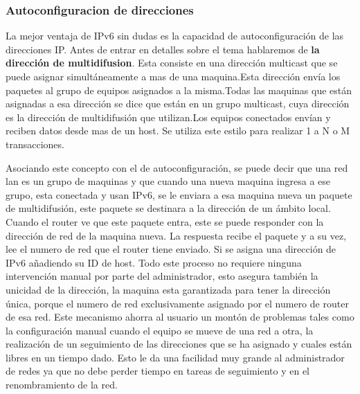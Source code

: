 \documentclass[11pt,a4paper]{article}
\begin{document}
\subsubsection{Autoconfiguracion de direcciones}
La mejor ventaja de IPv6 sin dudas es la capacidad de autoconfiguración de las direcciones IP. Antes 
de entrar en detalles sobre el tema hablaremos de \textbf{la dirección de multidifusion}. Esta 
consiste en una dirección multicast que se puede asignar simultáneamente a mas de una maquina.Esta 
dirección envía los paquetes al grupo de equipos asignados a la misma.Todas las maquinas que están 
asignadas a esa dirección se dice que están en un grupo multicast, cuya dirección es la dirección  
de multidifusión que utilizan.Los equipos conectados envían y reciben datos desde mas de un host. Se 
utiliza este estilo para realizar 1 a N o M transacciones.\par
Asociando este concepto con el de autoconfiguración, se puede decir que una red lan es un grupo de 
maquinas y que cuando una nueva maquina ingresa a ese grupo, esta conectada y usan IPv6, se le 
enviara a esa maquina nueva un paquete de multidifusión, este paquete se destinara a la dirección 
de un ámbito local. Cuando el router ve que este paquete entra, este se puede responder con la 
dirección de red de la maquina nueva. La respuesta recibe el paquete y a su vez, lee el numero de 
red que el router tiene enviado. Si se asigna una dirección de IPv6 añadiendo su ID de host. Todo 
este proceso no requiere ninguna intervención manual por parte del administrador, esto asegura 
también la unicidad de la dirección, la maquina esta garantizada para tener la dirección única, 
porque el numero de red exclusivamente asignado por el numero de router de esa red.
Este mecanismo ahorra al usuario un montón de problemas tales como la configuración manual cuando el 
equipo se mueve de una red a otra, la realización de un seguimiento de las direcciones que se ha 
asignado y cuales están libres en un tiempo dado.
Esto le da una facilidad muy grande al administrador de redes ya que no debe perder tiempo en tareas 
de seguimiento y en el renombramiento de la red.
\end{document}
